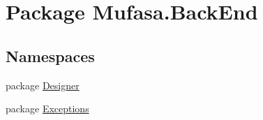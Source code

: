 \hypertarget{namespace_mufasa_1_1_back_end}{\section{Package Mufasa.\+Back\+End}
\label{namespace_mufasa_1_1_back_end}
}
\subsection*{Namespaces}
\begin{DoxyCompactItemize}
\item 
package \hyperlink{namespace_mufasa_1_1_back_end_1_1_designer}{Designer}
\item 
package \hyperlink{namespace_mufasa_1_1_back_end_1_1_exceptions}{Exceptions}
\end{DoxyCompactItemize}
